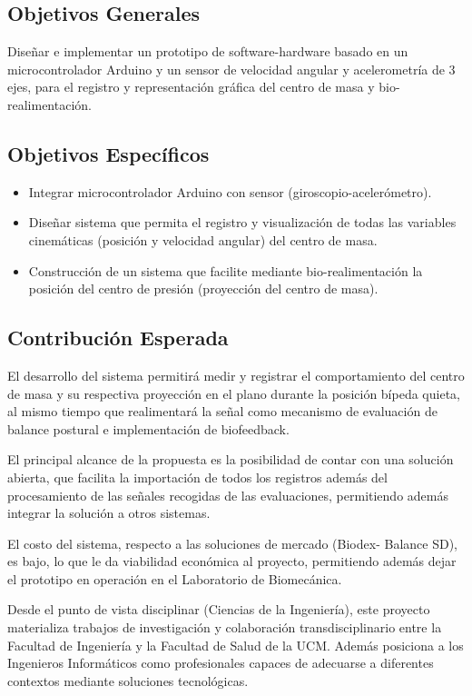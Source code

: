 \documentclass[12pt,a4paper]{article}
\begin{document}
\subsection{Objetivos Generales}
Diseñar e implementar un prototipo de software-hardware basado en un microcontrolador Arduino y un sensor de velocidad angular y acelerometría de 3 ejes, para el registro y representación gráfica del centro de masa y bio-realimentación.

\subsection{Objetivos Específicos}
\begin{itemize}
	\item Integrar microcontrolador Arduino con sensor (giroscopio-acelerómetro).
	\item Diseñar sistema que permita el registro y visualización de todas las variables cinemáticas (posición y velocidad angular) del centro de masa. 
	\item Construcción de un sistema que facilite mediante bio-realimentación la posición del centro de presión (proyección del centro de masa).
\end{itemize}	

\subsection{Contribución Esperada}

El desarrollo del sistema permitirá medir y registrar el comportamiento del centro de masa y su respectiva proyección en el plano durante la posición bípeda quieta, al mismo tiempo que realimentará la señal como mecanismo de evaluación de balance postural e implementación de biofeedback.

El principal alcance de la propuesta es la posibilidad de contar con una solución abierta, que facilita la importación de todos los registros además del procesamiento de las señales recogidas de las evaluaciones, permitiendo además integrar la solución a otros sistemas.

El costo del sistema, respecto a las soluciones de mercado (Biodex- Balance SD), es bajo, lo que le da viabilidad económica al proyecto, permitiendo además dejar el prototipo en operación en el Laboratorio de Biomecánica. 

Desde el punto de vista disciplinar (Ciencias de la Ingeniería), este proyecto materializa trabajos de investigación y colaboración transdisciplinario entre la Facultad de Ingeniería y la Facultad de Salud de la UCM. Además posiciona a los Ingenieros Informáticos como profesionales capaces de adecuarse a diferentes contextos mediante soluciones tecnológicas.
\end{document}
